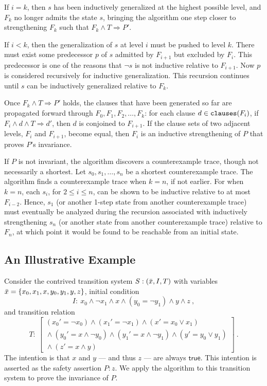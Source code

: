 \documentclass{llncs}
\newcommand{\set}[1]{ \{ #1 \} }
\newcommand{\band}{\wedge}
\newcommand{\bor}{\vee}
\newcommand{\bnot}{\neg}
\newcommand{\Bimplies}{\Rightarrow}
\newcommand{\vtrue}{\mathsf{true}}
\begin{document}
If $i = k$, then $s$ has been inductively generalized at the highest
possible level, and $F_k$ no longer admits the state $s$, bringing the
algorithm one step closer to strengthening $F_k$ such that $F_k \band
T \Bimplies P'$.

If $i < k$, then the generalization of $s$ at level $i$ must be pushed
to level $k$.  There must exist some predecessor $p$ of $s$ admitted
by $F_{i+1}$ but excluded by $F_{i}$.  This predecessor is one of the
reasons that $\bnot s$ is not inductive relative to $F_{i+1}$.  Now
$p$ is considered recursively for inductive generalization.  This
recursion continues until $s$ can be inductively generalized relative
to $F_k$.

Once $F_k \band T \Bimplies P'$ holds, the clauses that have been
generated so far are propagated forward through
$F_0,F_1,F_2,\ldots,F_k$: for each clause $d \in \mbox{\tt
  clauses}(F_i)$, if $F_i \band d \band T \Bimplies d'$, then $d$ is
conjoined to $F_{i+1}$.  If the clause sets of two adjacent levels,
$F_i$ and $F_{i+1}$, become equal, then $F_i$ is an inductive
strengthening of $P$ that proves $P$'s invariance.

If $P$ is not invariant, the algorithm discovers a counterexample
trace, though not necessarily a shortest.  Let $s_0,s_1,\ldots,s_n$ be
a shortest counterexample trace.  The algorithm finds a counterexample
trace when $k = n$, if not earlier.  For when $k = n$, each $s_i$, for
$2 \le i \le n$, can be shown to be inductive relative to at most
$F_{i-2}$.  Hence, $s_1$ (or another 1-step state from another
counterexample trace) must eventually be analyzed during the recursion
associated with inductively strengthening $s_n$ (or another state from
another counterexample trace) relative to $F_n$, at which point it
would be found to be reachable from an initial state.

\subsection{An Illustrative Example}
\label{subsec:illustration}

Consider the contrived transition system $S: (\bar{x}, I, T)$ with
variables $\vx = \set{x_0, x_1, x, y_0, y_1, y, z}$, initial condition
\[
I:\ x_0 \band \bnot x_1 \band x \band (y_0 = \bnot y_1) \band y \band z~,
\]
and transition relation
\[
T:\
\left[\begin{array}{l}
(x_0' = \bnot x_0) \band (x_1' = \bnot x_1) \band (x' = x_0 \bor x_1) \\
\mbox{} \band 
(y_0' = x \band \bnot y_0) \band (y_1' = x \band \bnot y_1) \band (y' = y_0 \bor y_1) \\
\mbox{} \band 
(z' = x \band y)
\end{array}\right]~.
\]
The intention is that $x$ and $y$ --- and thus $z$ --- are always
$\vtrue$.  This intention is asserted as the safety assertion $P: z$.
We apply the algorithm to this transition system to prove the
invariance of $P$.
\end{document}
